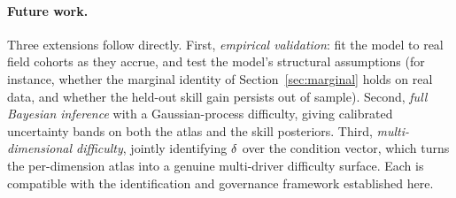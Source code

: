 \paragraph{Future work.} Three extensions follow directly. First, \emph{empirical
validation}: fit the model to real field cohorts as they accrue, and test the
model's structural assumptions (for instance, whether the marginal identity of
Section~\ref{sec:marginal} holds on real data, and whether the held-out skill
gain persists out of sample). Second, \emph{full Bayesian inference} with a
Gaussian-process difficulty, giving calibrated uncertainty bands on both the atlas
and the skill posteriors. Third, \emph{multi-dimensional difficulty}, jointly
identifying $\delta$ over the condition vector, which turns the per-dimension atlas
into a genuine multi-driver difficulty surface. Each is compatible with the
identification and governance framework established here.
